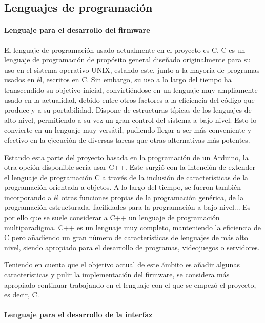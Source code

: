 \subsection{Lenguajes de programación}

\paragraph{Lenguaje para el desarrollo del firmware}

El lenguaje de programación usado actualmente en el proyecto es C. C es un lenguaje de programación de propósito general diseñado originalmente para su uso en el sistema operativo UNIX, estando este, junto a la mayoría de programas usados en él, escritos en C. Sin embargo, su uso a lo largo del tiempo ha transcendido su objetivo inicial, convirtiéndose en un lenguaje muy ampliamente usado en la actualidad, debido entre otros factores a la eficiencia del código que produce y a su portabilidad. Dispone de estructuras típicas de los lenguajes de alto nivel, permitiendo a su vez un gran control del sistema a bajo nivel. Esto lo convierte en un lenguaje muy versátil, pudiendo llegar a ser más conveniente y efectivo en la ejecución de diversas tareas que otras alternativas más potentes. \cite{k&r}

Estando esta parte del proyecto basada en la programación de un Arduino, la otra opción disponible sería usar C++. Este surgió con la intención de extender el lenguaje de programación C a través de la inclusión de características de la programación orientada a objetos. A lo largo del tiempo, se fueron también incorporando a él otras funciones propias de la programación genérica, de la programación estructurada, facilidades para la programación a bajo nivel... Es por ello que se suele considerar a C++ un lenguaje de programación multiparadigma. C++ es un lenguaje muy completo, manteniendo la eficiencia de C pero añadiendo un gran número de características de lenguajes de más alto nivel, siendo apropiado para el desarrollo de programas, videojuegos o servidores.

Teniendo en cuenta que el objetivo actual de este ámbito es añadir algunas características y pulir la implementación del firmware, se considera más apropiado continuar trabajando en el lenguaje con el que se empezó el proyecto, es decir, C. 

\paragraph{Lenguaje para el desarrollo de la interfaz}

